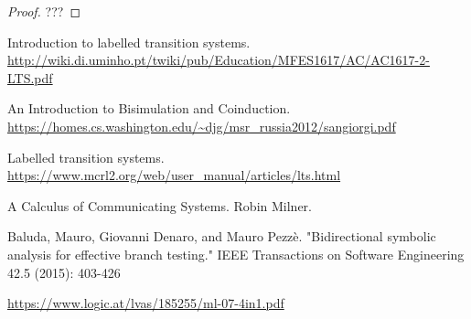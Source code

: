 \documentclass{article}
\begin{document}
\begin{proof}
\rm ???
\end{proof}


\newpage
\begin{thebibliography}{9}
Introduction to labelled transition systems. \newline\url{http://wiki.di.uminho.pt/twiki/pub/Education/MFES1617/AC/AC1617-2-LTS.pdf}

An Introduction to Bisimulation and Coinduction. \newline\url{https://homes.cs.washington.edu/~djg/msr_russia2012/sangiorgi.pdf}

Labelled transition systems. \newline\url{https://www.mcrl2.org/web/user_manual/articles/lts.html}


A Calculus of Communicating Systems. Robin Milner. 

Baluda, Mauro, Giovanni Denaro, and Mauro Pezzè. "Bidirectional symbolic analysis for effective branch testing." IEEE Transactions on Software Engineering 42.5 (2015): 403-426

\url{https://www.logic.at/lvas/185255/ml-07-4in1.pdf}
\end{thebibliography}
\end{document}
